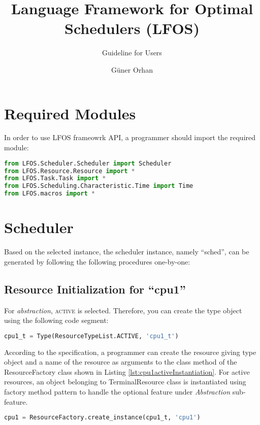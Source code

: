 \documentclass[]{scrartcl}
\title{Language Framework for Optimal Schedulers (LFOS)}
\subtitle{Guideline for Users}
\author{G\"{u}ner Orhan}
\begin{document}
\maketitle
    
\section{Required Modules}
In order to use LFOS frameowrk API, a programmer should import the required module:

\begin{lstlisting}[language=Python, frame=single, label={lst:moduleImport}, caption={Importing required modules}]
from LFOS.Scheduler.Scheduler import Scheduler
from LFOS.Resource.Resource import *
from LFOS.Task.Task import *
from LFOS.Scheduling.Characteristic.Time import Time
from LFOS.macros import *
\end{lstlisting}
        

\section{Scheduler}
Based on the selected instance, the scheduler instance, namely ``\textsf{sched}'', can be generated by following the following procedures one-by-one:
        
\subsection{Resource Initialization for ``\textsf{cpu1}''}
        
For \emph{abstraction}, \textsc{active} is selected. Therefore, you can create the type object using the following code segment:

\begin{lstlisting}[language=Python, frame=single, label={lst:activeType}, caption={Active resource type object instantiation}]
cpu1_t = Type(ResourceTypeList.ACTIVE, 'cpu1_t')
\end{lstlisting}
        
        
According to the specification, a programmer can create the resource giving type object and a name of the resource as arguments to the class method of the
ResourceFactory class shown in Listing \ref{lst:cpu1activeInstantiation}. For active resources, an object belonging to \textsf{TerminalResource} class is instantiated
using factory method pattern to handle the optional feature under \emph{Abstraction} sub-feature.


\begin{lstlisting}[language=Python, frame=single, label={lst:cpu1activeInstantiation}, caption={Active resource instantiation using ResourceFactory class}]
cpu1 = ResourceFactory.create_instance(cpu1_t, 'cpu1')
\end{lstlisting}
        
\end{document}
